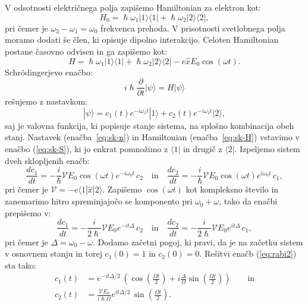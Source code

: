 V odsotnosti električnega polja zapišemo Hamiltonian za elektron kot:
\begin{equation}
H_0 = \hslash \omega_1 |1\rangle \langle1| + \hslash \omega_2 |2\rangle \langle2|,
\end{equation}
pri čemer je $\omega_2- \omega_1 = \omega_0$ frekvenca prehoda. V prisotnosti 
svetlobnega polja moramo dodati še člen, ki opisuje dipolno interakcijo. Celoten
Hamiltonian postane časovno odvisen in ga zapišemo kot:
\begin{equation}
H = \hslash \omega_1 |1\rangle \langle1| + \hslash \omega_2 |2\rangle \langle2|
-e\hat{x}E_0 \cos (\omega t).
\label{eq:sk-H}
\end{equation}
Schr\"odingerjevo enačbo:
\begin{equation}
i \hslash \frac{\partial}{\partial t}|\psi\rangle = H|\psi\rangle
\label{eq:sk-S}
\end{equation}
rešujemo z nastavkom:
\begin{equation}
|\psi\rangle = c_1(t)e^{-i \omega_1t}|1\rangle + c_2(t)e^{-i \omega_2t}|2\rangle,
\label{eq:sk-n}
\end{equation}
saj je valovna funkcija, ki popisuje stanje sistema, na splošno
kombinacija obeh stanj. Nastavek (enačba~\ref{eq:sk-n}) in Hamiltonian 
(enačba~\ref{eq:sk-H}) vstavimo v enačbo (\ref{eq:sk-S}), ki jo enkrat pomnožimo 
z $\langle1|$ in drugič z $\langle2|$. Izpeljemo sistem dveh sklopljenih enačb:
\begin{equation}
\frac{d c_1}{dt}=-\frac{i}{\hslash} \mathcal{V} E_0\cos (\omega t) e^{-i\omega_0 t}\, c_2 
\quad \mathrm{in} \quad
\frac{d c_2}{dt}=-\frac{i}{\hslash} \mathcal{V} E_0\cos (\omega t) e^{i\omega_0 t}\, c_1,
\label{eq:c1c2}
\end{equation}
pri čemer je $\mathcal{V} = -e\langle1|\hat{x}|2\rangle$. Zapišemo $\cos(\omega t)$ kot
kompleksno število in zanemarimo hitro spreminjajočo se komponento pri $\omega_0 + \omega$,
tako da enačbi prepišemo v:
\begin{equation}
\frac{d c_1}{dt}=-\frac{i}{2\hslash} \mathcal{V} E_0 e^{-it\Delta}\, c_2 
\quad \mathrm{in} \quad
\frac{d c_2}{dt}=-\frac{i}{2\hslash} \mathcal{V} E_0 e^{it\Delta}\, c_1,
\label{eq:rabi2}
\end{equation}
pri čemer je $\Delta = \omega_0-\omega$. Dodamo začetni pogoj, ki pravi, da je na začetku
sistem v osnovnem stanju in torej $c_1(0)=1$ in $c_2(0)=0$. Rešitvi enačb
(\ref{eq:rabi2}) sta tako:
\begin{align}
c_1(t)&=e^{-it\Delta/2}\, \left(\cos\left(\frac{\Omega t}{2}\right) + 
i \frac{\Delta}{\Omega} \sin\left(\frac{\Omega t}{2}\right) \right)\qquad \mathrm{in} 
\label{eq:rabi3} \\
c_2(t)&=\frac{\mathcal{V}E_0}{i\hslash \Omega} e^{it\Delta/2}\, \sin\left(\frac{\Omega t}{2}\right)\!\!.
\label{eq:rabi4}
\end{align}
